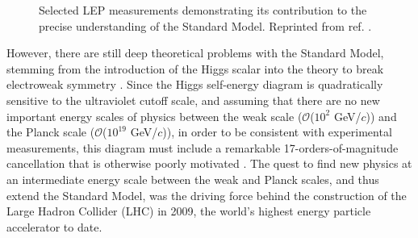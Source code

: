 \documentclass[dissertation.tex]{subfiles}
\begin{document}
\begin{figure}
	\caption{Selected LEP measurements demonstrating its contribution to the precise understanding of the Standard Model.  Reprinted from ref. \cite{Drees}.}
	\label{fig:LEP}
\end{figure}

However, there are still deep theoretical problems with the Standard Model, stemming from the introduction of the Higgs scalar into the theory to break electroweak symmetry \cite{Higgs}.  Since the Higgs self-energy diagram is quadratically sensitive to the ultraviolet cutoff scale, and assuming that there are no new important energy scales of physics between the weak scale ($\mathcal{O}$($10^{2}$ GeV/$c$)) and the Planck scale ($\mathcal{O}$($10^{19}$ GeV/$c$)), in order to be consistent with experimental measurements, this diagram must include a remarkable 17-orders-of-magnitude cancellation that is otherwise poorly motivated \cite{Aitchison}.  The quest to find new physics at an intermediate energy scale between the weak and Planck scales, and thus extend the Standard Model, was the driving force behind the construction of the Large Hadron Collider (LHC) in 2009, the world's highest energy particle accelerator to date.
\end{document}
